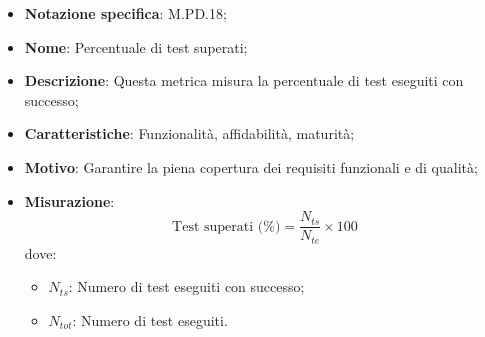 \begin{itemize}
    \item \textbf{Notazione specifica}: M.PD.18;
    \item \textbf{Nome}: Percentuale di test superati;
    \item \textbf{Descrizione}: Questa metrica misura la percentuale di test eseguiti con successo;
    \item \textbf{Caratteristiche}: Funzionalità, affidabilità, maturità;
    \item \textbf{Motivo}: Garantire la piena copertura dei requisiti funzionali e di qualità;
    \item \textbf{Misurazione}:
    \[
    \text{Test superati (\%)} = \frac{N_{ts}}{N_{te}} \times 100
    \]
    dove:
    \begin{itemize}
        \item $N_{ts}$: Numero di test eseguiti con successo;
        \item $N_{tot}$: Numero di test eseguiti.
    \end{itemize}
\end{itemize}
